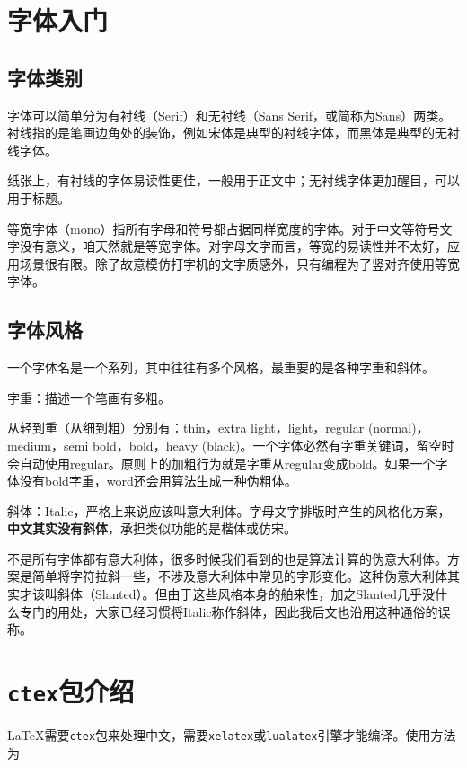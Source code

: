 \documentclass[10pt,openany]{book}
\begin{document}
\section{字体入门}

\subsection{字体类别}

字体可以简单分为有衬线（Serif）和无衬线（Sans Serif，或简称为Sans）两类。衬线指的是笔画边角处的装饰，例如宋体是典型的衬线字体，而黑体是典型的无衬线字体。

纸张上，有衬线的字体易读性更佳，一般用于正文中；无衬线字体更加醒目，可以用于标题。

等宽字体（mono）指所有字母和符号都占据同样宽度的字体。对于中文等符号文字没有意义，咱天然就是等宽字体。对字母文字而言，等宽的易读性并不太好，应用场景很有限。除了故意模仿打字机的文字质感外，只有编程为了竖对齐使用等宽字体。

\subsection{字体风格}

一个字体名是一个系列，其中往往有多个风格，最重要的是各种字重和斜体。

字重：描述一个笔画有多粗。

从轻到重（从细到粗）分别有：thin，extra light，light，regular (normal)，medium，semi bold，bold，heavy (black)。一个字体必然有字重关键词，留空时会自动使用regular。原则上的加粗行为就是字重从regular变成bold。如果一个字体没有bold字重，word还会用算法生成一种伪粗体。

斜体：Italic，严格上来说应该叫意大利体。字母文字排版时产生的风格化方案，\textbf{中文其实没有斜体}，承担类似功能的是楷体或仿宋。

不是所有字体都有意大利体，很多时候我们看到的也是算法计算的伪意大利体。方案是简单将字符拉斜一些，不涉及意大利体中常见的字形变化。这种伪意大利体其实才该叫斜体（Slanted）。但由于这些风格本身的舶来性，加之Slanted几乎没什么专门的用处，大家已经习惯将Italic称作斜体，因此我后文也沿用这种通俗的误称。

\section{\texttt{ctex}包介绍}

\LaTeX 需要\texttt{ctex}包来处理中文，需要\texttt{xelatex}或\texttt{lualatex}引擎才能编译。使用方法为
\end{document}
